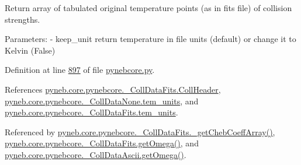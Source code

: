 \begin{DoxyVerb}Return array of tabulated original temperature points (as in fits file) 
    of collision strengths.

Parameters:
    - keep_unit   return temperature in file units (default) or change it to Kelvin (False)\end{DoxyVerb}
 

Definition at line \hyperlink{pynebcore_8py_source_l00897}{897} of file \hyperlink{pynebcore_8py_source}{pynebcore.\-py}.



References \hyperlink{pynebcore_8py_source_l00638}{pyneb.\-core.\-pynebcore.\-\_\-\-Coll\-Data\-Fits.\-Coll\-Header}, \hyperlink{pynebcore_8py_source_l00081}{pyneb.\-core.\-pynebcore.\-\_\-\-Coll\-Data\-None.\-tem\-\_\-units}, and \hyperlink{pynebcore_8py_source_l00589}{pyneb.\-core.\-pynebcore.\-\_\-\-Coll\-Data\-Fits.\-tem\-\_\-units}.



Referenced by \hyperlink{pynebcore_8py_source_l00751}{pyneb.\-core.\-pynebcore.\-\_\-\-Coll\-Data\-Fits.\-\_\-get\-Cheb\-Coeff\-Array()}, \hyperlink{pynebcore_8py_source_l00828}{pyneb.\-core.\-pynebcore.\-\_\-\-Coll\-Data\-Fits.\-get\-Omega()}, and \hyperlink{pynebcore_8py_source_l01082}{pyneb.\-core.\-pynebcore.\-\_\-\-Coll\-Data\-Ascii.\-get\-Omega()}.


